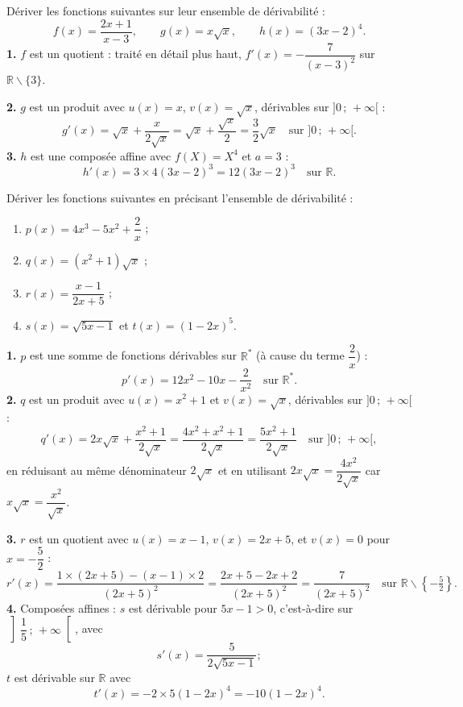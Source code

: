 \documentclass[11pt]{article}
\def\setminus{\mathbin{\backslash}}\let\smallsetminus\setminus
\begin{document}
\begin{exoresolu}
Dériver les fonctions suivantes sur leur ensemble de dérivabilité :
\[
f(x) = \frac{2x+1}{x-3}, \qquad g(x) = x\sqrt{x}, \qquad h(x) = (3x-2)^4.
\]
\tcblower
\textbf{1.} $f$ est un quotient : traité en détail plus haut, $f'(x) = -\dfrac{7}{(x-3)^2}$ sur $\mathbb{R}\setminus\{3\}$.\par
\textbf{2.} $g$ est un produit avec $u(x)=x$, $v(x)=\sqrt{x}$, dérivables sur $]0\,;\,+\infty[$ :
\[
g'(x) = \sqrt{x} + \frac{x}{2\sqrt{x}} = \sqrt{x} + \frac{\sqrt{x}}{2} = \frac{3}{2}\sqrt{x} \quad \text{sur } ]0\,;\,+\infty[.
\]
\textbf{3.} $h$ est une composée affine avec $f(X) = X^4$ et $a = 3$ :
\[
h'(x) = 3\times 4(3x-2)^3 = 12(3x-2)^3 \quad \text{sur } \mathbb{R}.
\]
\end{exoresolu}

\begin{exercice}
Dériver les fonctions suivantes en précisant l'ensemble de dérivabilité :
\begin{enumerate}
\item $p(x) = 4x^3 - 5x^2 + \dfrac{2}{x}$ ;
\item $q(x) = (x^2+1)\sqrt{x}$ ;
\item $r(x) = \dfrac{x-1}{2x+5}$ ;
\item $s(x) = \sqrt{5x-1}$ et $t(x) = (1-2x)^5$.
\end{enumerate}
\end{exercice}

\begin{corrige}[Exercice 1]
\textbf{1.} $p$ est une somme de fonctions dérivables sur $\mathbb{R}^*$ (à cause du terme $\dfrac{2}{x}$) :
\[
p'(x) = 12x^2 - 10x - \frac{2}{x^2} \quad \text{sur } \mathbb{R}^*.
\]
\textbf{2.} $q$ est un produit avec $u(x) = x^2+1$ et $v(x) = \sqrt{x}$, dérivables sur $]0\,;\,+\infty[$ :
\[
q'(x) = 2x\sqrt{x} + \frac{x^2+1}{2\sqrt{x}} = \frac{4x^2 + x^2 + 1}{2\sqrt{x}} = \frac{5x^2+1}{2\sqrt{x}} \quad \text{sur } ]0\,;\,+\infty[,
\]
en réduisant au même dénominateur $2\sqrt{x}$ et en utilisant $2x\sqrt{x} = \dfrac{4x^2}{2\sqrt{x}}$ car $x\sqrt{x} = \dfrac{x^2}{\sqrt{x}}$.\par
\textbf{3.} $r$ est un quotient avec $u(x) = x-1$, $v(x) = 2x+5$, et $v(x) = 0$ pour $x = -\dfrac{5}{2}$ :
\[
r'(x) = \frac{1\times(2x+5)-(x-1)\times 2}{(2x+5)^2} = \frac{2x+5-2x+2}{(2x+5)^2} = \frac{7}{(2x+5)^2} \quad \text{sur } \mathbb{R}\setminus\left\{-\tfrac{5}{2}\right\}.
\]
\textbf{4.} Composées affines : $s$ est dérivable pour $5x-1 > 0$, c'est-à-dire sur $\left]\dfrac{1}{5}\,;\,+\infty\right[$, avec
\[
s'(x) = \frac{5}{2\sqrt{5x-1}} ;
\]
$t$ est dérivable sur $\mathbb{R}$ avec
\[
t'(x) = -2\times 5(1-2x)^4 = -10(1-2x)^4.
\]
\end{corrige}
\end{document}
